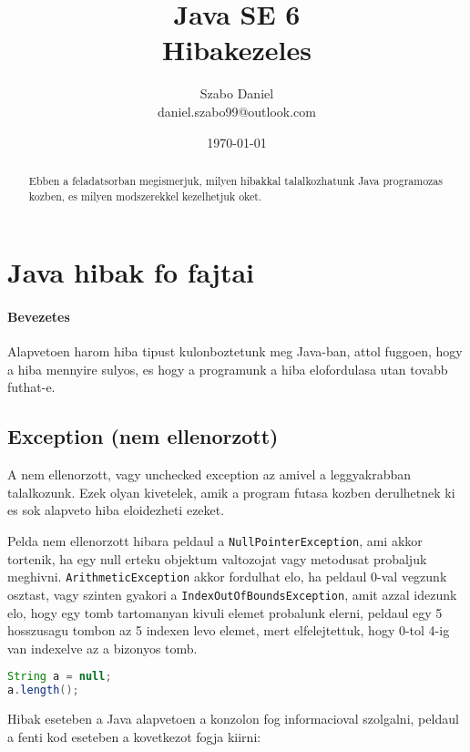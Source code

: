 \documentclass{article}
\title{%
Java SE 6 \\
\large Hibakezeles}
\author{Szabo Daniel\\daniel.szabo99@outlook.com}
\date{\today}
\let\l\lstinline
\begin{document}
\maketitle
\begin{abstract}
Ebben a feladatsorban megismerjuk, milyen hibakkal talalkozhatunk Java programozas kozben, es milyen modszerekkel kezelhetjuk oket.
\end{abstract}

\newpage

\tableofcontents{}

\newpage

\section{Java hibak fo fajtai}

\paragraph{Bevezetes}

Alapvetoen harom hiba tipust kulonboztetunk meg Java-ban, attol fuggoen, hogy a hiba mennyire sulyos, es hogy a programunk a hiba elofordulasa utan tovabb futhat-e.

\subsection{Exception (nem ellenorzott)}
A nem ellenorzott, vagy unchecked exception az amivel a leggyakrabban talalkozunk. Ezek olyan kivetelek, amik a program futasa kozben derulhetnek ki es sok alapveto hiba eloidezheti ezeket.

Pelda nem ellenorzott hibara peldaul a \l{NullPointerException}, ami akkor tortenik, ha egy null erteku objektum valtozojat vagy metodusat probaljuk meghivni. \l{ArithmeticException} akkor fordulhat elo, ha peldaul 0-val vegzunk osztast, vagy szinten gyakori a \l{IndexOutOfBoundsException}, amit azzal idezunk elo, hogy egy tomb tartomanyan kivuli elemet probalunk elerni, peldaul egy 5 hosszusagu tombon az 5 indexen levo elemet, mert elfelejtettuk, hogy 0-tol 4-ig van indexelve az a bizonyos tomb.

\begin{lstlisting}[language=Java, caption=NullPointerException-t dobo kodreszlet]
String a = null;
a.length();
\end{lstlisting}

Hibak eseteben a Java alapvetoen a konzolon fog informacioval szolgalni, peldaul a fenti kod eseteben a kovetkezot fogja kiirni:
\end{document}
